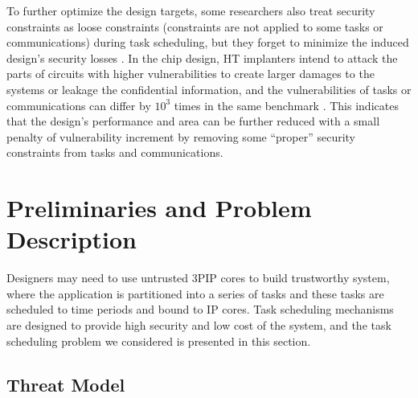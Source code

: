 \documentclass[10pt,journal, compsoc]{IEEEtran}
\begin{document}



To further optimize the design targets, some researchers also treat security constraints as loose constraints (constraints are not applied to some tasks or communications) during task scheduling, but they forget to minimize the induced design's security losses \cite{article:CL, article:NW, conference:NW}. In the chip design, HT implanters intend to attack the parts of circuits with higher vulnerabilities to create larger damages to the systems or leakage the confidential information, and the vulnerabilities of tasks or communications can differ by $10^3$ times in the same benchmark \cite{conference:HS}. This indicates that the design's performance and area can be further reduced with a small penalty of vulnerability increment by removing some ``proper'' security constraints from tasks and communications.%




\section{Preliminaries and Problem Description}


Designers may need to use untrusted 3PIP cores to build trustworthy system, where the application is partitioned into a series of tasks and these tasks are scheduled to time periods and bound to IP cores. Task scheduling mechanisms are designed to provide high security and low cost of the system, and the task scheduling problem we considered is presented in this section.

\subsection{Threat Model}
\end{document}
